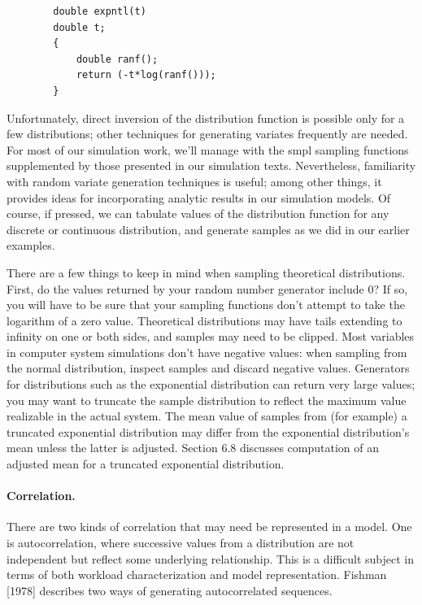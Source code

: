 \begin{verbatim}
        double expntl(t)
        double t;
        {
            double ranf();
            return (-t*log(ranf()));
        }
\end{verbatim}
Unfortunately, direct inversion of the distribution function is possible only
for a few distributions; other techniques for generating variates frequently
are needed. For most of our simulation work, we'll manage with the smpl
sampling functions supplemented by those presented in our simulation texts.
Nevertheless, familiarity with random variate generation techniques is useful;
among other things, it provides ideas for incorporating analytic results in our
simulation models. Of course, if pressed, we can tabulate values of the
distribution function for any discrete or continuous distribution, and generate
samples as we did in our earlier examples.

There are a few things to keep in mind when sampling theoretical distributions.
First, do the values returned by your random number generator include 0? If so,
you will have to be sure that your sampling functions don't attempt to take the
logarithm of a zero value. Theoretical distributions may have tails extending
to infinity on one or both sides, and samples may need to be clipped. Most
variables in computer system simulations don't have negative values: when
sampling from the normal distribution, inspect samples and discard negative
values. Generators for distributions such as the exponential distribution can
return very large values; you may want to truncate the sample distribution to
reflect the maximum value realizable in the actual system. The mean value of
samples from (for example) a truncated exponential distribution may differ from
the exponential distribution's mean unless the latter is adjusted. Section 6.8
discusses computation of an adjusted mean for a truncated exponential
distribution.

\paragraph{Correlation.}
There are two kinds of correlation that may need be represented in a model. One
is autocorrelation, where successive values from a distribution are not
independent but reflect some underlying relationship. This is a difficult
subject in terms of both workload characterization and model representation.
Fishman [1978] describes two ways of generating autocorrelated sequences.

